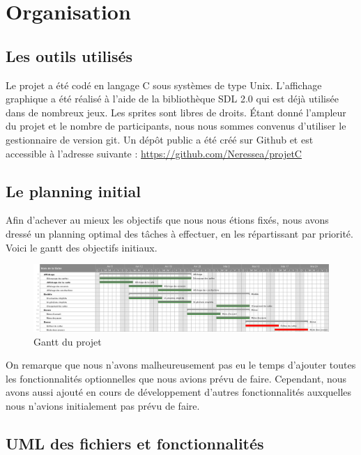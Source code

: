 \section{Organisation}

\subsection{Les outils utilisés}

Le projet a été codé en langage C sous systèmes de type Unix. L’affichage graphique a été réalisé à l’aide de la
bibliothèque SDL 2.0 qui est déjà utilisée dans de nombreux jeux. Les sprites sont libres de droits. Étant donné l’ampleur du projet et le
nombre de participants, nous nous sommes convenus d’utiliser le gestionnaire de version git. Un dépôt public a été créé sur Github et est accessible à l'adresse suivante : \url{https://github.com/Neressea/projetC}

\subsection{Le planning initial}

Afin d'achever au mieux les objectifs que nous nous étions fixés, nous avons dressé un planning optimal des tâches à effectuer, en les répartissant par priorité. Voici le gantt des objectifs initiaux.

\begin{figure}[!ht]
    \includegraphics[width=1.1\textwidth]{./images/gantt.png}
    \caption{Gantt du projet}
\end{figure}

On remarque que nous n'avons malheureusement pas eu le temps d'ajouter toutes les fonctionnalités optionnelles que nous avions prévu de faire. Cependant, nous avons aussi ajouté en cours de développement d'autres fonctionnalités auxquelles nous n'avions initialement pas prévu de faire.

\subsection{UML des fichiers et fonctionnalités}

